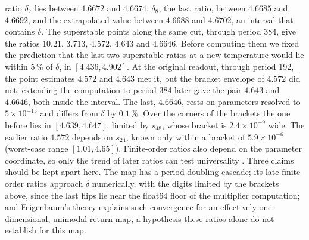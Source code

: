 \documentclass[11pt,letterpaper]{article}
\begin{document}
ratio $\delta_7$ lies between $4.6672$ and $4.6674$, $\delta_8$, the last ratio, between $4.6685$ and $4.6692$, and the
extrapolated value between $4.6688$ and $4.6702$, an interval that contains $\delta$. The
superstable points along the same cut, through period 384, give the ratios $10.21$, $3.713$, $4.572$, $4.643$ and
$4.6646$. Before computing them we fixed the prediction that the last two superstable ratios at a new temperature
would lie within 5\,\% of $\delta$, in $[4.436,4.902]$. At the original readout, through period 192, the point
estimates $4.572$ and $4.643$ met it, but the bracket envelope of $4.572$ did not; extending the computation to period
384 later gave the pair $4.643$ and $4.6646$, both inside the interval. The last, $4.6646$, rests on parameters resolved to $5\times10^{-15}$ and
differs from $\delta$ by $0.1\,\%$. Over the corners of the brackets the one before lies in $[4.639,4.647]$,
limited by $s_{48}$, whose bracket is $2.4\times10^{-9}$ wide. The earlier ratio $4.572$ depends on $s_{24}$, known only
within a bracket of $5.9\times10^{-6}$ (worst-case range $[1.01,4.65]$).
Finite-order ratios also depend on the parameter coordinate, so only the trend of later ratios can
test universality \cite{feigenbaum1978quantitative,papasavvas2015gain,liu2026learningchaos}. Three claims should be kept apart here.
The map has a period-doubling cascade; its late finite-order ratios approach $\delta$ numerically, with the digits
limited by the brackets above, since the last flips lie near the float64 floor of the multiplier computation; and
Feigenbaum's theory explains such convergence for an effectively one-dimensional, unimodal return map, a hypothesis
these ratios alone do not establish for this map.
\end{document}
